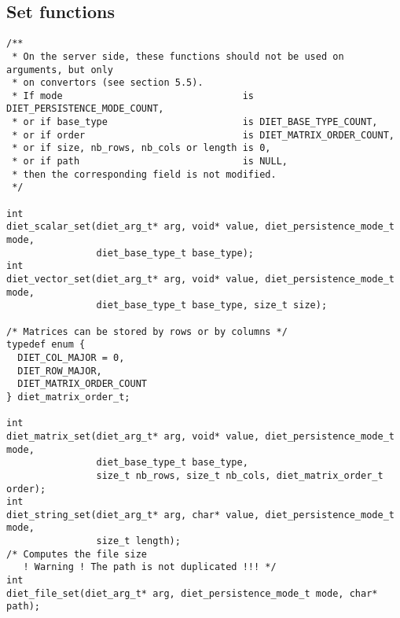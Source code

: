 \subsection{Set functions}


\label{sec:setfun}
{\footnotesize
\begin{verbatim}
/**
 * On the server side, these functions should not be used on arguments, but only
 * on convertors (see section 5.5).
 * If mode                                is DIET_PERSISTENCE_MODE_COUNT, 
 * or if base_type                        is DIET_BASE_TYPE_COUNT,
 * or if order                            is DIET_MATRIX_ORDER_COUNT,
 * or if size, nb_rows, nb_cols or length is 0,
 * or if path                             is NULL,
 * then the corresponding field is not modified.
 */

int
diet_scalar_set(diet_arg_t* arg, void* value, diet_persistence_mode_t mode,
                diet_base_type_t base_type);
int
diet_vector_set(diet_arg_t* arg, void* value, diet_persistence_mode_t mode,
                diet_base_type_t base_type, size_t size);

/* Matrices can be stored by rows or by columns */
typedef enum {
  DIET_COL_MAJOR = 0,
  DIET_ROW_MAJOR,
  DIET_MATRIX_ORDER_COUNT
} diet_matrix_order_t;

int
diet_matrix_set(diet_arg_t* arg, void* value, diet_persistence_mode_t mode,
                diet_base_type_t base_type,
                size_t nb_rows, size_t nb_cols, diet_matrix_order_t order);
int
diet_string_set(diet_arg_t* arg, char* value, diet_persistence_mode_t mode,
                size_t length);
/* Computes the file size
   ! Warning ! The path is not duplicated !!! */
int
diet_file_set(diet_arg_t* arg, diet_persistence_mode_t mode, char* path);
\end{verbatim}
}


